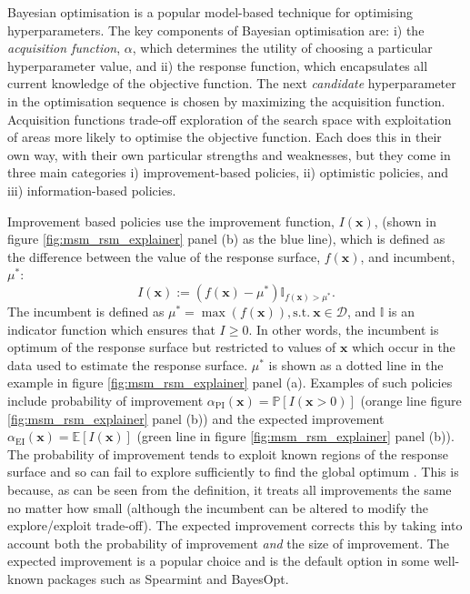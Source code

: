 Bayesian optimisation is a popular model-based technique for optimising hyperparameters\cite{bergstraAlgorithmsHyperParameterOptimizationa,hutterSequentialModelbasedOptimization2011,NIPS2012_4522,bergstraMakingScienceModel2013,feurer2019hyperparameter}. The key components of Bayesian optimisation are: i) the \emph{acquisition function}, $\alpha$, which determines the utility of choosing a particular hyperparameter value, and ii) the response function, which encapsulates all current knowledge of the objective function.  The next \emph{candidate} hyperparameter in the optimisation sequence is chosen by maximizing the acquisition function\cite{shahriariTakingHumanOut2016}. Acquisition functions trade-off exploration of the search space with exploitation of areas more likely to optimise the objective function. Each does this in their own way, with their own particular strengths and weaknesses, but they come in three main categories i) improvement-based policies, ii) optimistic policies, and iii) information-based policies\cite{shahriariTakingHumanOut2016}.

Improvement based policies use the improvement function, $I(\mathbf{x})$, (shown in figure \ref{fig:msm_rsm_explainer} panel (b) as the blue line), which is defined as the  difference between the value of the response surface, $f(\mathbf{x})$, and incumbent, $\mu^{*}$\cite{shahriariTakingHumanOut2016}:
\begin{equation}
    I(\mathbf{x}):=\left(f(\mathbf{x}) - \mu^{*}\right) \mathbb{I}_{f(\mathbf{x}) > \mu^{*}}. 
\end{equation}
The incumbent\cite{brochuTutorialBayesianOptimization2010} is defined as $\mu^{*}=\max{(f(\mathbf{x}))}, \mathrm{s.t.}\ \mathbf{x} \in \mathcal{D}$, and $\mathbb{I}$ is an indicator function which ensures that $I \ge 0$. In other words, the incumbent is optimum of the response surface but restricted to values of $\mathbf{x}$ which occur in the data used to estimate the response surface. $\mu^{*}$ is shown as a dotted line in the example in figure \ref{fig:msm_rsm_explainer} panel (a). Examples of such policies include probability of improvement \cite{Kushner1963} $\alpha_{\mathrm{PI}}(\mathbf{x}) = \mathbb{P}\left[I(\mathbf{x}>0)\right]$  (orange line figure \ref{fig:msm_rsm_explainer} panel (b)) and the expected improvement \cite{mockus1978application} $\alpha_{\mathrm{EI}}(\mathbf{x}) = \mathbb{E}\left[I(\mathbf{x})\right]$ (green line in figure \ref{fig:msm_rsm_explainer} panel (b)). The probability of improvement tends to exploit known regions of the response surface and so can fail to explore sufficiently to find the global optimum \cite{jones2001taxonomy}. This is because, as can be seen from the definition, it treats all improvements the same no matter how small (although the incumbent can be altered to modify the explore/exploit trade-off)\cite{jones2001taxonomy}.  The expected improvement corrects this by taking into account both the probability of improvement \emph{and} the size of improvement. The expected improvement is a popular choice \cite{feurer2019hyperparameter} and is the default option in some well-known packages such as Spearmint\cite{NIPS2012_4522} and BayesOpt\cite{martinez-cantinBayesOptBayesianOptimization2014}. 

